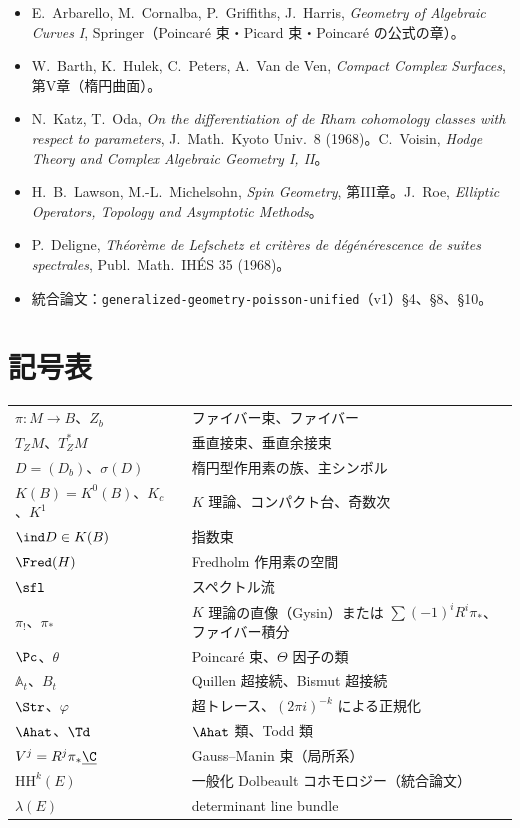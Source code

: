 \begin{itemize}
\item E.~Arbarello, M.~Cornalba, P.~Griffiths, J.~Harris, \emph{Geometry of Algebraic Curves I}, Springer（Poincaré 束・Picard 束・Poincaré の公式の章\tQ{}）。
\item W.~Barth, K.~Hulek, C.~Peters, A.~Van de Ven, \emph{Compact Complex Surfaces}, 第V章（楕円曲面）。
\item N.~Katz, T.~Oda, \emph{On the differentiation of de Rham cohomology classes with respect to parameters}, J.\ Math.\ Kyoto Univ.\ 8 (1968)。C.~Voisin, \emph{Hodge Theory and Complex Algebraic Geometry I, II}。
\item H.~B.~Lawson, M.-L.~Michelsohn, \emph{Spin Geometry}, 第III章。J.~Roe, \emph{Elliptic Operators, Topology and Asymptotic Methods}。
\item P.~Deligne, \emph{Th\'eor\`eme de Lefschetz et crit\`eres de d\'eg\'en\'erescence de suites spectrales}, Publ.\ Math.\ IH\'ES 35 (1968)。
\item 統合論文：\texttt{generalized-geometry-poisson-unified}（v1）\S4、\S8、\S10。
\end{itemize}

\section*{記号表}
\begin{tabular}{lp{11cm}}
$\pi:M\to B$、$Z_b$ & ファイバー束、ファイバー\\
$T_ZM$、$T^*_ZM$ & 垂直接束、垂直余接束\\
$D=(D_b)$、$\sigma(D)$ & 楕円型作用素の族、主シンボル\\
$K(B)=K^0(B)$、$K_c$、$K^1$ & $K$ 理論、コンパクト台、奇数次\\
$\ind D\in K(B)$ & 指数束\\
$\Fred(H)$ & Fredholm 作用素の空間\\
$\sfl$ & スペクトル流\\
$\pi_!$、$\pi_*$ & $K$ 理論の直像（Gysin）または $\sum(-1)^iR^i\pi_*$、ファイバー積分\\
$\Pc$、$\theta$ & Poincaré 束、$\Theta$ 因子の類\\
$\mathbb A_t$、$B_t$ & Quillen 超接続、Bismut 超接続\\
$\Str$、$\varphi$ & 超トレース、$(2\pi i)^{-k}$ による正規化\\
$\Ahat$、$\Td$ & $\Ahat$ 類、Todd 類\\
$V^j=R^j\pi_*\underline\C$ & Gauss--Manin 束（局所系）\\
$\mathrm{HH}^k(E)$ & 一般化 Dolbeault コホモロジー（統合論文）\\
$\lambda(E)$ & determinant line bundle\\
\end{tabular}

